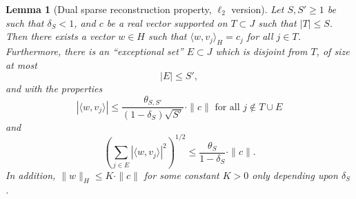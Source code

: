 \documentclass[11pt]{article}
\newcommand{\<}{\langle}
\renewcommand{\>}{\rangle}
\newtheorem{lemma}[theorem]{Lemma}
\numberwithin{equation}{section}
\begin{document}
\begin{lemma}[Dual sparse reconstruction property, $\ell_2$ version]
\label{erp-2}  
Let $S,S' \geq 1$ be such that $\delta_S < 1$, and $c$ be a real
vector supported on $T \subset J$ such that $|T| \leq S$. Then there
exists a vector $w \in H$ such that $\langle w, v_j \rangle_H = c_j$
for all $j \in T$.  Furthermore, there is an ``exceptional set''
$E \subset J$ which is disjoint from $T$, of size at most 
\begin{equation}\label{et}
|E| \leq S', 
\end{equation}
and with the properties 
$$
|\langle w, v_j \rangle| \leq
\frac{\theta_{S,S'}}{(1-\delta_S)\sqrt{S'}} \cdot \|c\| \text{ for
  all } j \not \in T \cup E$$
and
$$
(\sum_{j \in E} |\langle w, v_j \rangle|^2)^{1/2} \leq
\frac{\theta_S}{1 - \delta_{S}} \cdot \|c\|.$$
In addition, $\|w\|_H
\leq K \cdot \|c\|$ for some constant $K > 0$ only depending upon
$\delta_S$. 
\end{lemma}
\end{document}
